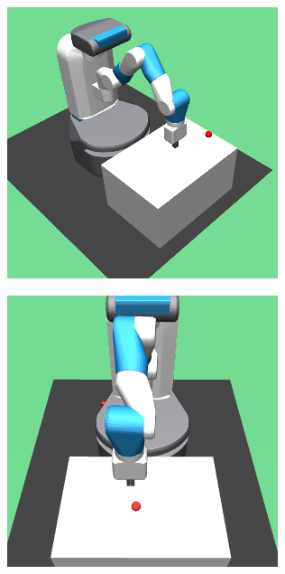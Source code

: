 \begin{figure}
  \centering
  \begin{subfigure}{0.49\columnwidth}
    \includegraphics[width=\linewidth]{figures/chapter6/fetch_sim.png}
  \end{subfigure}
  \begin{subfigure}{0.49\columnwidth}
    \includegraphics[width=\linewidth]{figures/chapter6/fetch_view.png}

\end{subfigure}
\end{figure}
